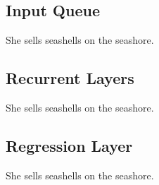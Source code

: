 \subsection{Input Queue}
She sells seashells on the seashore.

\subsection{Recurrent Layers}
She sells seashells on the seashore.

\subsection{Regression Layer}
She sells seashells on the seashore.
